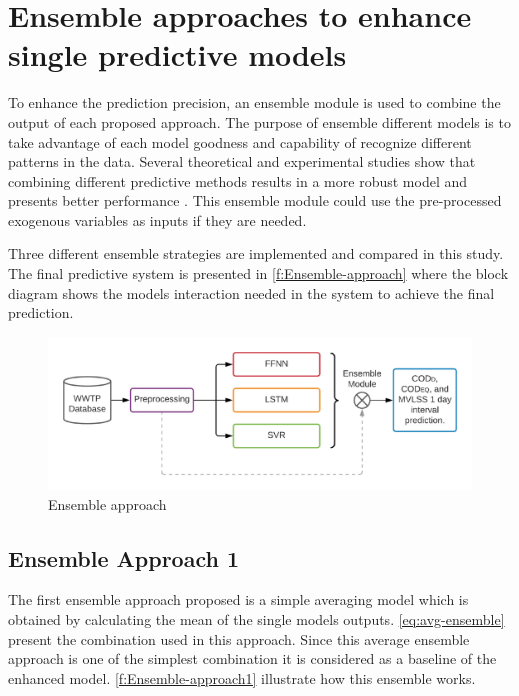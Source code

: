 \section{Ensemble approaches to enhance single predictive models}
\label{s:Ensembles}

To enhance the prediction precision, an ensemble module is used to combine the output of each proposed approach. The purpose of ensemble different models is to take advantage of each model goodness and capability of recognize different patterns in the data. Several theoretical and experimental studies show that combining different predictive methods results in a more robust model and presents better performance \cite{Nourani2021}. This ensemble module could use the pre-processed exogenous variables as inputs if they are needed.

Three different ensemble strategies are implemented and compared in this study. The final predictive system is presented in \autoref{f:Ensemble-approach} where the block diagram shows the models interaction needed in the system to achieve the final prediction. 

\begin{figure}[h]
\centering
\includegraphics[width=\linewidth]{figures/Ch5/Thesis-Approaches-Ensemble.pdf}
\caption{Ensemble approach}
\label{f:Ensemble-approach}
\end{figure}

\subsection{Ensemble Approach 1}
\label{s:Ensemble-Approach1}
The first ensemble approach proposed is a simple averaging model which is obtained by calculating the mean of the single models outputs. \autoref{eq:avg-ensemble} present the combination used in this approach. Since this average ensemble approach is one of the simplest combination it is considered as a baseline of the enhanced model. \autoref{f:Ensemble-approach1} illustrate how this ensemble works.

